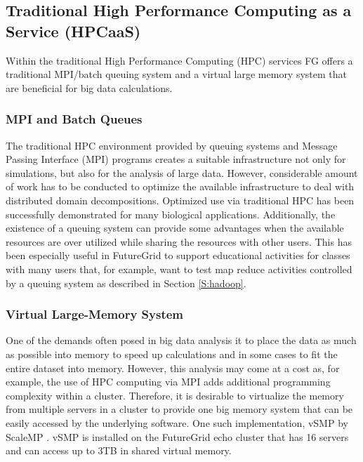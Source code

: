 \documentclass[graybox]{svmult}
\begin{document}
\subsection{Traditional High Performance Computing as a Service (HPCaaS)}

Within the traditional High Performance Computing (HPC) services FG offers a traditional MPI/batch queuing system and a virtual large memory system that are beneficial for big data calculations.

\subsubsection{MPI and Batch Queues}

The traditional HPC environment provided by queuing systems and Message Passing Interface (MPI) programs creates a suitable infrastructure not only for simulations, but also for the analysis of large data. However, considerable amount of work has to be conducted to optimize the available infrastructure to deal with distributed domain decompositions. Optimized use via traditional HPC has been successfully demonstrated for many biological applications. Additionally, the existence of a queuing system can provide some advantages when the available resources are over utilized while sharing the resources with other users.  This has been especially useful in FutureGrid to support educational activities for classes with many users that, for example, want to test map reduce activities controlled by a queuing system as described in Section \ref{S:hadoop}.

\subsubsection{Virtual Large-Memory System}

One of the demands often posed in big data analysis it to place the data as much as possible into memory to speed up calculations and in some cases to fit the entire dataset into memory. However, this analysis may come at a cost as, for example, the use of HPC computing via MPI adds additional programming complexity within a cluster. Therefore, it is desirable to virtualize the memory from multiple servers in a cluster to provide one big memory system that can be easily accessed by the underlying software.  One such implementation, vSMP by ScaleMP \cite{www-scalemp} \cite{las12fg-bookchapter}. vSMP is installed on the FutureGrid echo cluster that has 16 servers and can access up to 3TB in shared virtual memory.
\end{document}
